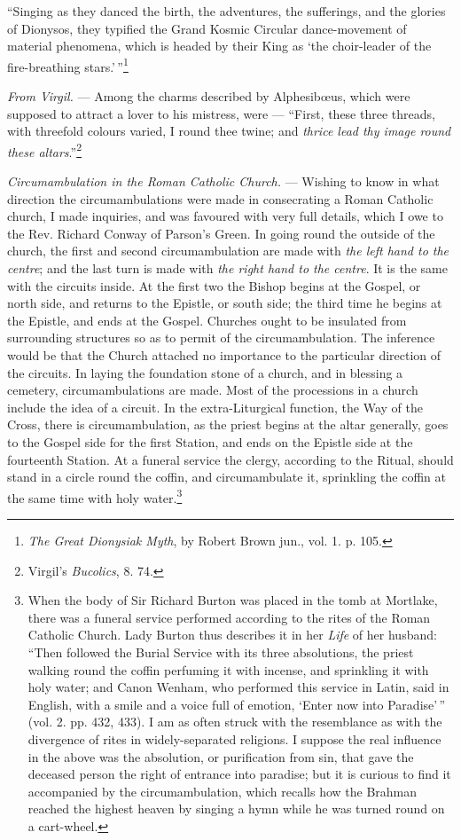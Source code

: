 \documentclass[a4paper, 11pt, oneside, polutonikogreek, english]{article}
\begin{document}
``Singing as they danced the birth, the adventures, the sufferings, and the glories of Dionysos, they typified the Grand Kosmic Circular dance-movement of material phenomena, which is headed by their King as `the choir-leader of the fire-breathing stars.'\,''\footnote{\emph{The Great Dionysiak Myth}, by Robert Brown jun., vol. 1. p. 105.}

\emph{From Virgil.} --- Among the charms described by Alphesibœus, which were supposed to attract a lover to his mistress, were --- ``First, these three threads, with threefold colours varied, I round thee twine; and \emph{thrice lead thy image round these altars}.''\footnote{Virgil's \emph{Bucolics}, 8. 74.}

\emph{Circumambulation in the Roman Catholic Church.} --- Wishing to know in what direction the circumambulations were made in consecrating a Roman Catholic church, I made inquiries, and was favoured with very full details, which I owe to the Rev. Richard Conway of Parson's Green. In going round the outside of the church, the first and second circumambulation are made with \emph{the left hand to the centre}; and the last turn is made with \emph{the right hand to the centre}. It is the same with the circuits inside. At the first two the Bishop begins at the Gospel, or north side, and returns to the Epistle, or south side; the third time he begins at the Epistle, and ends at the Gospel. Churches ought to be insulated from surrounding structures so as to permit of the circumambulation. The inference would be that the Church attached no importance to the particular direction of the circuits. In laying the foundation stone of a church, and in blessing a cemetery, circumambulations are made. Most of the processions in a church include the idea of a circuit. In the extra-Liturgical function, the Way of the Cross, there is circumambulation, as the priest begins at the altar generally, goes to the Gospel side for the first Station, and ends on the Epistle side at the fourteenth Station. At a funeral service the clergy, according to the Ritual, should stand in a circle round the coffin, and circumambulate it, sprinkling the coffin at the same time with holy water.\footnote{When the body of Sir Richard Burton was placed in the tomb at Mortlake, there was a funeral service performed according to the rites of the Roman Catholic Church. Lady Burton thus describes it in her \emph{Life} of her husband: ``Then followed the Burial Service with its three absolutions, the priest walking round the coffin perfuming it with incense, and sprinkling it with holy water; and Canon Wenham, who performed this service in Latin, said in English, with a smile and a voice full of emotion, `Enter now into Paradise'\,'' (vol. 2. pp. 432, 433). I am as often struck with the resemblance as with the divergence of rites in widely-separated religions. I suppose the real influence in the above was the absolution, or purification from sin, that gave the deceased person the right of entrance into paradise; but it is curious to find it accompanied by the circumambulation, which recalls how the Brahman reached the highest heaven by singing a hymn while he was turned round on a cart-wheel.}
\end{document}

